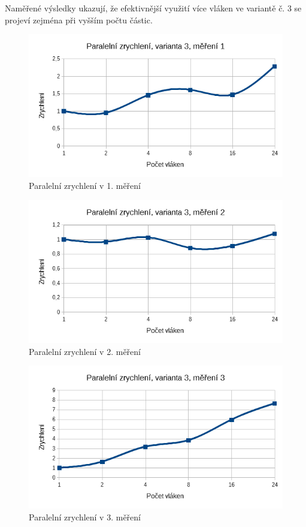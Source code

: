 \documentclass[12pt]{article}
\begin{document}
Naměřené výsledky ukazují, že efektivnější využití více vláken ve variantě č. 3 se projeví zejména při vyšším počtu částic.

\begin{figure}[H]
  \begin{center}
     \includegraphics[width=12cm]{images/ssef1acc.png}
    \caption{Paralelní zrychlení v 1. měření} 
  \end{center}
\end{figure}

\begin{figure}[H]
  \begin{center}
     \includegraphics[width=12cm]{images/ssef2acc.png}
    \caption{Paralelní zrychlení v 2. měření} 
  \end{center}
\end{figure}

\begin{figure}[H]
  \begin{center}
     \includegraphics[width=12cm]{images/ssef3acc.png}
    \caption{Paralelní zrychlení v 3. měření} 
  \end{center}
\end{figure}
\end{document}
